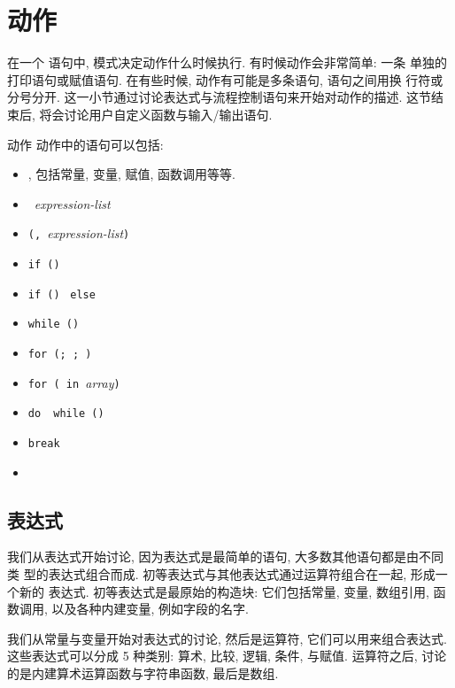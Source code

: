 \section{动作}
\label{sec:actions}

在一个 \patact 语句中, 模式决定动作什么时候执行. 有时候动作会非常简单: 一条
单独的打印语句或赋值语句. 在有些时候, 动作有可能是多条语句, 语句之间用换
行符或分号分开. 这一小节通过讨论表达式与流程控制语句来开始对动作的描述. 
这节结束后, 将会讨论用户自定义函数与输入/输出语句.
\begin{summary}{动作}
    动作中的语句可以包括:
    \begin{itemize}
\item[] \indent      \expr, 包括常量, 变量, 赋值, 函数调用等等.
\item[] \indent      \print\ \textit{expression-list}
\item[] \indent      \printf\verb'('\fmt\verb', '\textit{expression-list}\verb')'
\item[] \indent      \verb'if ('\expr\verb')' \stmt
\item[] \indent      \verb'if ('\expr\verb')' \stmt\ \verb'else '\stmt
\item[] \indent      \verb'while ('\expr\verb') '\stmt
\item[] \indent      \verb'for ('\expr\verb'; '\expr\verb'; '\expr\verb') '\stmt
\item[] \indent      \verb'for ('\expr\verb' in '\textit{array}\verb')' \stmt
\item[] \indent      \verb'do '\stmt\ \verb'while ('\expr\verb')'
\item[] \indent      \texttt{break}
\item[] \indent      \ctn
    \end{itemize}
\end{summary}

\subsection{表达式}
\label{subsec:expressions}

我们从表达式开始讨论, 因为表达式是最简单的语句, 大多数其他语句都是由不同类
型的表达式组合而成. 初等表达式与其他表达式通过运算符组合在一起, 形成一个新的
表达式. 初等表达式是最原始的构造块: 它们包括常量, 变量, 数组引用, 函数调用,
以及各种内建变量, 例如字段的名字.

我们从常量与变量开始对表达式的讨论, 然后是运算符, 它们可以用来组合表达式.
这些表达式可以分成 5 种类别: 算术, 比较, 逻辑, 条件, 与赋值. 运算符之后,
讨论的是内建算术运算函数与字符串函数, 最后是数组.

